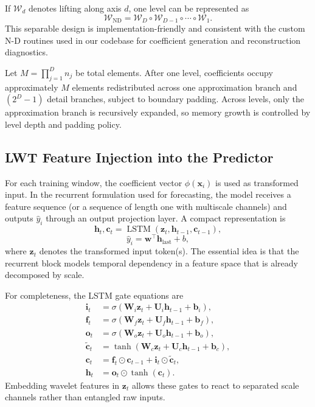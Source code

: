 \documentclass[journal]{IEEEtran}
\begin{document}
If $\mathcal{W}_d$ denotes lifting along axis $d$, one level can be represented as
\begin{equation}
\mathcal{W}_{\text{ND}}=\mathcal{W}_{D}\circ\mathcal{W}_{D-1}\circ\cdots\circ\mathcal{W}_{1}.
\end{equation}
This separable design is implementation-friendly and consistent with the custom N-D routines used in our codebase for coefficient generation and reconstruction diagnostics.

Let $M=\prod_{j=1}^{D}n_j$ be total elements. After one level, coefficients occupy approximately $M$ elements redistributed across one approximation branch and $(2^D-1)$ detail branches, subject to boundary padding. Across levels, only the approximation branch is recursively expanded, so memory growth is controlled by level depth and padding policy.

\subsection{LWT Feature Injection into the Predictor}
For each training window, the coefficient vector $\phi(\mathbf{x}_i)$ is used as transformed input. In the recurrent formulation used for forecasting, the model receives a feature sequence (or a sequence of length one with multiscale channels) and outputs $\hat{y}_i$ through an output projection layer. A compact representation is
\begin{equation}
\mathbf{h}_t,\mathbf{c}_t=\operatorname{LSTM}(\mathbf{z}_t,\mathbf{h}_{t-1},\mathbf{c}_{t-1}),
\end{equation}
\begin{equation}
\hat{y}_i=\mathbf{w}^\top \mathbf{h}_{\text{last}}+b,
\end{equation}
where $\mathbf{z}_t$ denotes the transformed input token(s). The essential idea is that the recurrent block models temporal dependency in a feature space that is already decomposed by scale.

For completeness, the LSTM gate equations are
\begin{align}
\mathbf{i}_t &= \sigma(\mathbf{W}_i\mathbf{z}_t+\mathbf{U}_i\mathbf{h}_{t-1}+\mathbf{b}_i),\\
\mathbf{f}_t &= \sigma(\mathbf{W}_f\mathbf{z}_t+\mathbf{U}_f\mathbf{h}_{t-1}+\mathbf{b}_f),\\
\mathbf{o}_t &= \sigma(\mathbf{W}_o\mathbf{z}_t+\mathbf{U}_o\mathbf{h}_{t-1}+\mathbf{b}_o),\\
\tilde{\mathbf{c}}_t &= \tanh(\mathbf{W}_c\mathbf{z}_t+\mathbf{U}_c\mathbf{h}_{t-1}+\mathbf{b}_c),\\
\mathbf{c}_t &= \mathbf{f}_t\odot\mathbf{c}_{t-1}+\mathbf{i}_t\odot\tilde{\mathbf{c}}_t,\\
\mathbf{h}_t &= \mathbf{o}_t\odot\tanh(\mathbf{c}_t).
\end{align}
Embedding wavelet features in $\mathbf{z}_t$ allows these gates to react to separated scale channels rather than entangled raw inputs.
\end{document}
